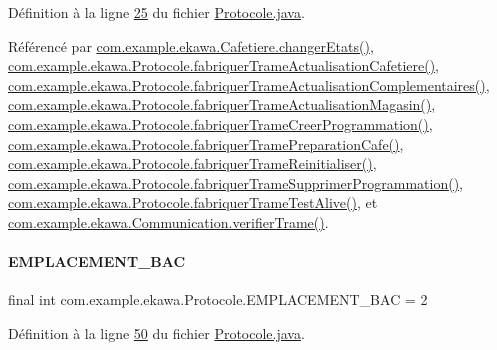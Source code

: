 Définition à la ligne \hyperlink{_protocole_8java_source_l00025}{25} du fichier \hyperlink{_protocole_8java_source}{Protocole.\+java}.



Référencé par \hyperlink{_cafetiere_8java_source_l00463}{com.\+example.\+ekawa.\+Cafetiere.\+changer\+Etats()}, \hyperlink{_protocole_8java_source_l00145}{com.\+example.\+ekawa.\+Protocole.\+fabriquer\+Trame\+Actualisation\+Cafetiere()}, \hyperlink{_protocole_8java_source_l00165}{com.\+example.\+ekawa.\+Protocole.\+fabriquer\+Trame\+Actualisation\+Complementaires()}, \hyperlink{_protocole_8java_source_l00155}{com.\+example.\+ekawa.\+Protocole.\+fabriquer\+Trame\+Actualisation\+Magasin()}, \hyperlink{_protocole_8java_source_l00175}{com.\+example.\+ekawa.\+Protocole.\+fabriquer\+Trame\+Creer\+Programmation()}, \hyperlink{_protocole_8java_source_l00099}{com.\+example.\+ekawa.\+Protocole.\+fabriquer\+Trame\+Preparation\+Cafe()}, \hyperlink{_protocole_8java_source_l00126}{com.\+example.\+ekawa.\+Protocole.\+fabriquer\+Trame\+Reinitialiser()}, \hyperlink{_protocole_8java_source_l00193}{com.\+example.\+ekawa.\+Protocole.\+fabriquer\+Trame\+Supprimer\+Programmation()}, \hyperlink{_protocole_8java_source_l00116}{com.\+example.\+ekawa.\+Protocole.\+fabriquer\+Trame\+Test\+Alive()}, et \hyperlink{_communication_8java_source_l00329}{com.\+example.\+ekawa.\+Communication.\+verifier\+Trame()}.

\mbox{\label{classcom_1_1example_1_1ekawa_1_1_protocole_ab60999720fc62237ae5f8c1e7921aa4d}} 
\paragraph{\texorpdfstring{E\+M\+P\+L\+A\+C\+E\+M\+E\+N\+T\+\_\+\+B\+AC}{EMPLACEMENT\_BAC}}
{\footnotesize\ttfamily final int com.\+example.\+ekawa.\+Protocole.\+E\+M\+P\+L\+A\+C\+E\+M\+E\+N\+T\+\_\+\+B\+AC = 2\hspace{0.3cm}{\ttfamily [static]}}



Définition à la ligne \hyperlink{_protocole_8java_source_l00050}{50} du fichier \hyperlink{_protocole_8java_source}{Protocole.\+java}.



